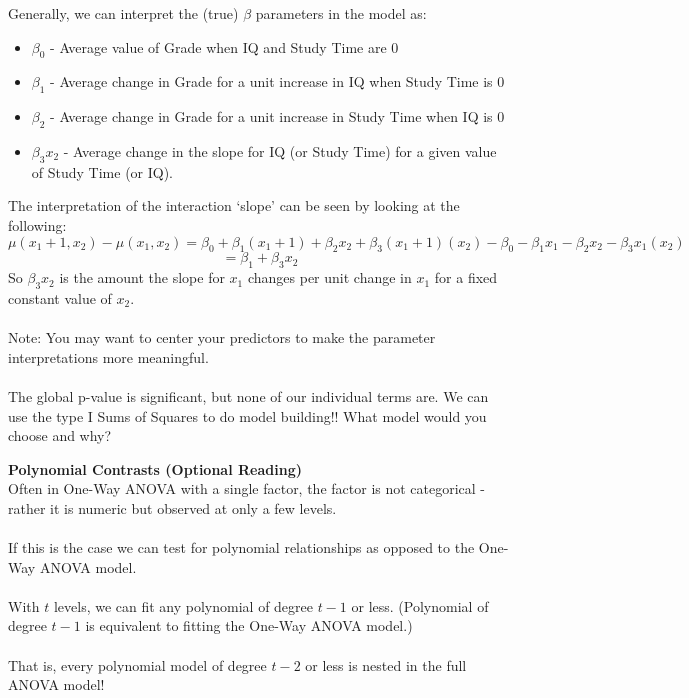 Generally, we can interpret the (true) $\beta$ parameters in the model as:
\begin{itemize}
\item $\beta_0$ - Average value of Grade when IQ and Study Time are 0
\item $\beta_1$ - Average change in Grade for a unit increase in IQ when Study Time is 0
\item $\beta_2$ - Average change in Grade for a unit increase in Study Time when IQ is 0
\item $\beta_3x_2$ - Average change in the slope for IQ (or Study Time) for a given value of Study Time (or IQ).
\end{itemize}
The interpretation of the interaction `slope' can be seen by looking at the following:
$$\mu(x_1+1,x_2)-\mu(x_1,x_2)=\beta_0+\beta_1(x_1+1)+\beta_2x_2+\beta_3(x_1+1)(x_2)-\beta_0-\beta_1x_1-\beta_2x_2-\beta_3x_1(x_2)$$
$$=\beta_1+\beta_3x_2$$
So $\beta_3x_2$ is the amount the slope for $x_1$ changes per unit change in $x_1$ for a fixed constant value of $x_2$.\\~\\

Note:  You may want to center your predictors to make the parameter interpretations more meaningful.\\~\\

The global p-value is significant, but none of our individual terms are.   We can use the type I Sums of Squares to do model building!!  What model would you choose and why?


\newpage

\Large\textbf{Polynomial Contrasts (Optional Reading)}\large\\
Often in One-Way ANOVA with a single factor, the factor is not categorical - rather it is numeric but observed at only a few levels.\\~\\

If this is the case we can test for polynomial relationships as opposed to the One-Way ANOVA model.\\~\\

With $t$ levels, we can fit any polynomial of degree $t-1$ or less.  (Polynomial of degree $t-1$ is equivalent to fitting the One-Way ANOVA model.) \\~\\

That is, every polynomial model of degree $t-2$ or less is nested in the full ANOVA model!\\~\\

